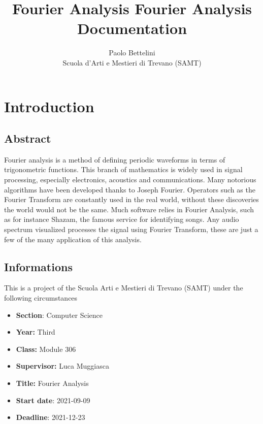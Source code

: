 \documentclass{article}
\title{Fourier Analysis}
\title{%
  Fourier Analysis \\
  \large Documentation}
\author{%
    Paolo Bettelini \\
    \large Scuola d'Arti e Mestieri di Trevano (SAMT)}
\date{}
\begin{document}
\maketitle

\pagebreak

\tableofcontents

\pagebreak

\section{Introduction}

\subsection{Abstract}

Fourier analysis is a method of defining periodic waveforms in terms of trigonometric functions.
This branch of mathematics is widely used in signal processing, especially electronics, acoustics and communications.
Many notorious algorithms have been developed thanks to Joseph Fourier. Operators such as the Fourier
Transform are constantly used in the real world, without these discoveries the world would not be the same.
Much software relies in Fourier Analysis, such as for instance Shazam, the famous service for identifying songs.
Any audio spectrum visualized processes the signal using Fourier Transform, these are just a few of the many application of this analysis.

\pagebreak

\subsection{Informations}

This is a project of the Scuola Arti e Mestieri di Trevano (SAMT) under the following circumstances

\begin{itemize}
    \item \textbf{Section}: Computer Science
    \item \textbf{Year:} Third
    \item \textbf{Class:} Module 306
    \item \textbf{Supervisor:} Luca Muggiasca
    \item \textbf{Title:} Fourier Analysis
    \item \textbf{Start date}: 2021-09-09
    \item \textbf{Deadline}: 2021-12-23
\end{itemize}
\end{document}
